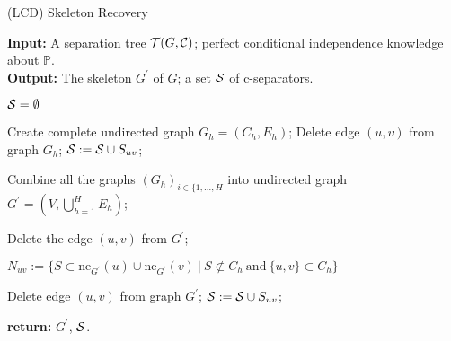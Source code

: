 \begin{algorithm}
	\caption{(LCD) Skeleton Recovery}\label{skeletonRecoveryAlg}
	
	\textbf{Input:} A separation tree $ \mathcal{T}(G, \mathcal{C})$; 
					perfect conditional independence knowledge about $\mathbb{P}$.  \\
	\textbf{Output:} The skeleton $G^{'}$ of $G$; a set $\mathcal{S}$ of c-separators.

	
	\begin{algorithmic}[1]
			\State $\mathcal{S} = \emptyset$
	
				\State	Create complete undirected graph $G_h = (C_h, E_h)$;
						\State Delete edge $(u, v)$ from graph $G_h$;
						\State $\mathcal{S} := \mathcal{S} \cup S_{uv}$; 
					\EndIf
				\EndFor
			\EndFor			
		
			\State Combine all the graphs $(G_h)_{i \in \{1, \dots, H}$ into undirected graph 
			$G^{'} = (V, \bigcup_{h = 1}^{H} E_h)$;
			
					\State Delete the edge $(u, v)$ from $G^{'}$;
				\EndIf
			\EndFor
			
					
				\State $N_{uv} := \{S \subset \mbox{ne}_{G^{'}}(u) \cup \mbox{ne}_{G^{'}}(v) \ | \ 
									S \not\subset C_h \ \mbox{and} \ \{u, v\} \subset C_h  \}$
									
					\State Delete edge $(u, v)$ from graph $G^{'}$;
					\State $\mathcal{S} := \mathcal{S} \cup S_{uv}$; 
				\EndIf
			\EndFor	
			
			\State \textbf{return:} $G^{'}$, $\mathcal{S}$.
		\EndProcedure
	\end{algorithmic}
\end{algorithm}



